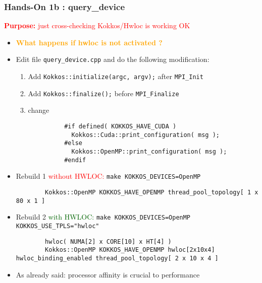 \begin{frame}[fragile=singleslide]
  \frametitle{Hands-On 1b : query\_device}

  {\large\textcolor{red}{\textbf{Purpose:} just cross-checking Kokkos/Hwloc is working OK}}

  \begin{itemize}
  \item \textcolor{orange}{\textbf{What happens if hwloc is not activated ?}}
  \item Edit file \texttt{query\_device.cpp} and do the following modification:
    \begin{enumerate}
    \item Add \texttt{Kokkos::initialize(argc, argv);} after \texttt{MPI\_Init}
    \item Add \texttt{Kokkos::finalize();} before \texttt{MPI\_Finalize}
    \item change\\
      {\small
        \begin{verbatim}
          #if defined( KOKKOS_HAVE_CUDA )
            Kokkos::Cuda::print_configuration( msg );
          #else
            Kokkos::OpenMP::print_configuration( msg );
          #endif
        \end{verbatim}
      }
    \end{enumerate}
  \item {\small Rebuild 1 \textcolor{red}{without HWLOC:} \texttt{make KOKKOS\_DEVICES=OpenMP}}
    {\small
      \begin{verbatim}
        Kokkos::OpenMP KOKKOS_HAVE_OPENMP thread_pool_topology[ 1 x 80 x 1 ]
      \end{verbatim}
    }
  \item {\small Rebuild 2 \textcolor{darkgreen}{with HWLOC:} \texttt{make KOKKOS\_DEVICES=OpenMP KOKKOS\_USE\_TPLS="hwloc"}}
    {\small 
      \begin{verbatim}
        hwloc( NUMA[2] x CORE[10] x HT[4] )
        Kokkos::OpenMP KOKKOS_HAVE_OPENMP hwloc[2x10x4] hwloc_binding_enabled thread_pool_topology[ 2 x 10 x 4 ]      
      \end{verbatim}
    }
    \item As already said: processor affinity is crucial to performance
  \end{itemize}

\end{frame}
